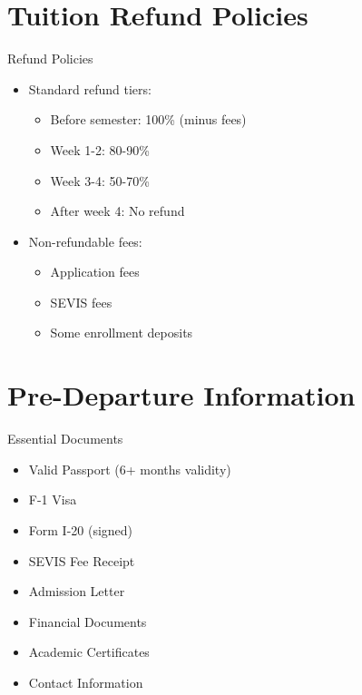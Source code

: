 \documentclass{beamer}
\begin{document}
\section{Tuition Refund Policies}
\begin{frame}{Refund Policies}
\begin{itemize}
\item Standard refund tiers:
    \begin{itemize}
    \item Before semester: 100\% (minus fees)
    \item Week 1-2: 80-90\%
    \item Week 3-4: 50-70\%
    \item After week 4: No refund
    \end{itemize}
\item Non-refundable fees:
    \begin{itemize}
    \item Application fees
    \item SEVIS fees
    \item Some enrollment deposits
    \end{itemize}
\end{itemize}
\end{frame}

\section{Pre-Departure Information}
\begin{frame}{Essential Documents}
\begin{itemize}
\item Valid Passport (6+ months validity)
\item F-1 Visa
\item Form I-20 (signed)
\item SEVIS Fee Receipt
\item Admission Letter
\item Financial Documents
\item Academic Certificates
\item Contact Information
\end{itemize}
\end{frame}
\end{document}
